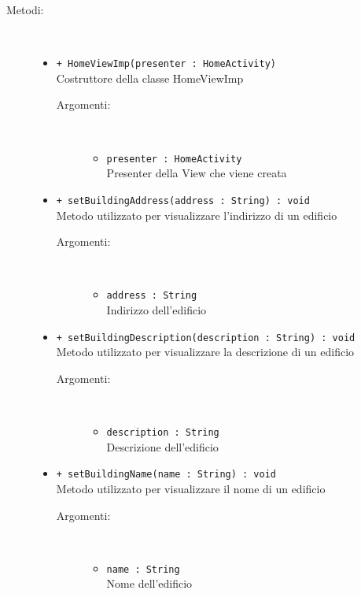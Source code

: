 \documentclass[../DefinizioneDiProdotto.tex]{subfiles}
\begin{document}
\begin{description}
\begin{itemize}
\end{itemize}
\item[Metodi:] \
\begin{itemize}
\item \texttt{+ HomeViewImp(presenter : HomeActivity)}\\
Costruttore della classe HomeViewImp
 \begin{description}
\item[Argomenti:] \
\begin{itemize}
\item \texttt{presenter : HomeActivity}\\
Presenter della View che viene creata\end{itemize}
\end{description}
\item \texttt{+ setBuildingAddress(address : String) : void}\\
Metodo utilizzato per visualizzare l'indirizzo di un edificio
 \begin{description}
\item[Argomenti:] \
\begin{itemize}
\item \texttt{address : String}\\
Indirizzo dell'edificio\end{itemize}
\end{description}
\item \texttt{+ setBuildingDescription(description : String) : void}\\
Metodo utilizzato per visualizzare la descrizione di un edificio
 \begin{description}
\item[Argomenti:] \
\begin{itemize}
\item \texttt{description : String}\\
Descrizione dell'edificio\end{itemize}
\end{description}
\item \texttt{+ setBuildingName(name : String) : void}\\
Metodo utilizzato per visualizzare il nome di un edificio
 \begin{description}
\item[Argomenti:] \
\begin{itemize}
\item \texttt{name : String}\\
Nome dell'edificio\end{itemize}

\end{description}
\end{itemize}
\end{description}
\end{document}

